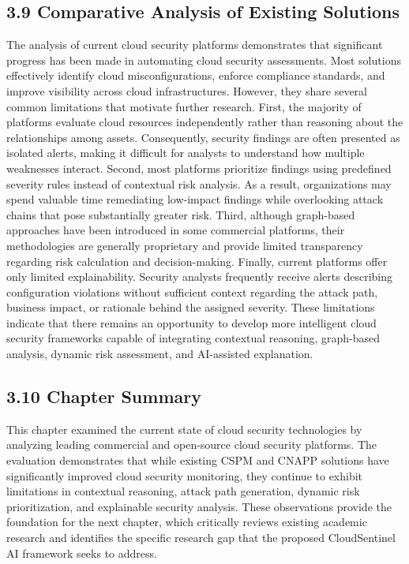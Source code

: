 \subsection{3.9 Comparative Analysis of Existing Solutions}

The analysis of current cloud security platforms demonstrates that significant progress has been made in automating cloud security assessments. Most solutions effectively identify cloud misconfigurations, enforce compliance standards, and improve visibility across cloud infrastructures. However, they share several common limitations that motivate further research. First, the majority of platforms evaluate cloud resources independently rather than reasoning about the relationships among assets. Consequently, security findings are often presented as isolated alerts, making it difficult for analysts to understand how multiple weaknesses interact. Second, most platforms prioritize findings using predefined severity rules instead of contextual risk analysis. As a result, organizations may spend valuable time remediating low-impact findings while overlooking attack chains that pose substantially greater risk. Third, although graph-based approaches have been introduced in some commercial platforms, their methodologies are generally proprietary and provide limited transparency regarding risk calculation and decision-making. Finally, current platforms offer only limited explainability. Security analysts frequently receive alerts describing configuration violations without sufficient context regarding the attack path, business impact, or rationale behind the assigned severity. These limitations indicate that there remains an opportunity to develop more intelligent cloud security frameworks capable of integrating contextual reasoning, graph-based analysis, dynamic risk assessment, and AI-assisted explanation.

\subsection{3.10 Chapter Summary}

This chapter examined the current state of cloud security technologies by analyzing leading commercial and open-source cloud security platforms. The evaluation demonstrates that while existing CSPM and CNAPP solutions have significantly improved cloud security monitoring, they continue to exhibit limitations in contextual reasoning, attack path generation, dynamic risk prioritization, and explainable security analysis. These observations provide the foundation for the next chapter, which critically reviews existing academic research and identifies the specific research gap that the proposed CloudSentinel AI framework seeks to address.
